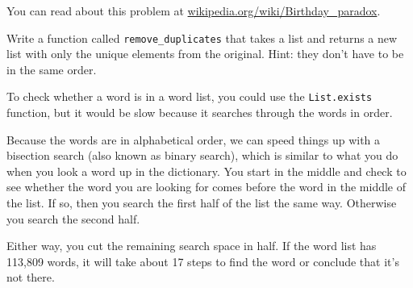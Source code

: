 \documentclass[10pt]{book}
\begin{document}
{\begin{ex}
You can read about this problem at
\url{wikipedia.org/wiki/Birthday_paradox}.%

\end{ex}


\begin{ex}


Write a function called \verb"remove_duplicates" that takes
a list and returns a new list with only the unique elements from
the original. Hint: they don't have to be in the same order.
\end{ex}


% 
% 
% 

\begin{ex}
\label{wordlist1}
\label{bisection}




To check whether a word is in a word list, you could use
the {\tt List.exists} function, but it would be slow because it searches
through the words in order.

Because the words are in alphabetical order, we can speed things up
with a bisection search (also known as binary search), which is
similar to what you do when you look a word up in the dictionary.  You
start in the middle and check to see whether the word you are looking
for comes before the word in the middle of the list.  If so, then you
search the first half of the list the same way.  Otherwise you search
the second half.

Either way, you cut the remaining search space in half.  If the
word list has 113,809 words, it will take about 17 steps to
find the word or conclude that it's not there.


\end{ex}}
\end{document}

